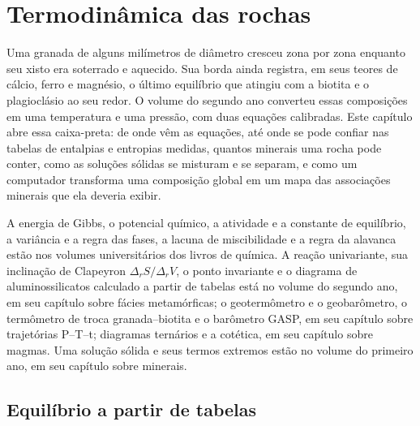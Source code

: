 \chapter{Termodinâmica das rochas}\label{ch:b3:petrological-thermodynamics}

Uma granada de alguns milímetros de diâmetro cresceu zona por zona enquanto seu xisto era soterrado
e aquecido. Sua borda ainda registra, em seus teores de cálcio, ferro e magnésio, o último
equilíbrio que atingiu com a biotita e o plagioclásio ao seu redor. O volume do segundo ano
converteu essas composições em uma temperatura e uma pressão, com duas equações calibradas.
Este capítulo abre essa caixa-preta: de onde vêm as equações,
até onde se pode confiar nas tabelas de entalpias e entropias medidas,
quantos minerais uma rocha pode conter, como as soluções sólidas se misturam e
se separam, e como um computador transforma uma composição global em um mapa das
associações minerais que ela deveria exibir.

\begin{recall}
A energia de Gibbs, o potencial químico, a atividade e a constante de
equilíbrio, a variância e a regra das fases, a lacuna de miscibilidade e a
regra da alavanca estão nos volumes universitários dos livros de química. A reação univariante,
sua inclinação de Clapeyron $\Delta_rS/\Delta_rV$, o ponto invariante e o
diagrama de aluminossilicatos calculado a partir de tabelas está no volume do segundo ano, em seu
capítulo sobre fácies metamórficas; o geotermômetro e o geobarômetro, o
termômetro de troca granada--biotita e o barômetro GASP, em seu capítulo sobre
trajetórias P--T--t; diagramas ternários e a cotética, em seu capítulo sobre magmas. Uma
solução sólida e seus termos extremos estão no volume do primeiro ano, em seu capítulo sobre
minerais.
\end{recall}

\section{Equilíbrio a partir de tabelas}\label{sec:b3:petrological-thermodynamics:tables}

